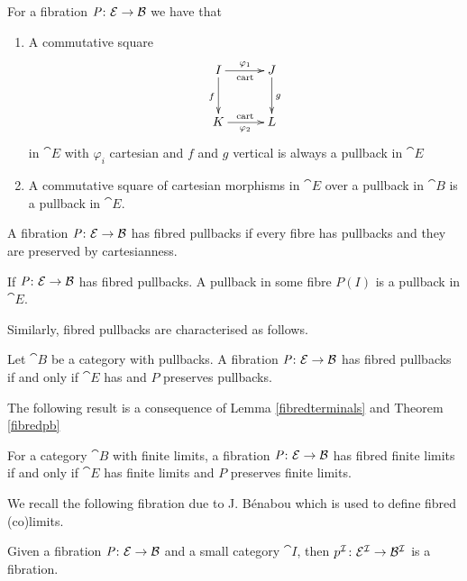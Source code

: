 \documentclass[9pt, leqno]{amsart}
\begin{document}
\begin{lemma}[\cite{TS}] For a fibration $\operatorname{\textit{P} \colon \mathcal{E} \rightarrow \mathcal{B}}$ we have that
	
	\begin{enumerate}
		\item A commutative square
		\begin{equation*}
			\xymatrix@=1cm{
				I \ar[d]_{f} \ar[r]^{\varphi_1}_{\text{cart}} & J \ar[d]^{g} \\
				K \ar[r]_{\varphi_2}^{\text{cart}} & L
			}
		\end{equation*}
		in $\cat{E}$ with $\varphi_i$ cartesian and $f$ and $g$ vertical is always a pullback in $\cat{E}$
		
		\item A commutative square of cartesian morphisms in $\cat{E}$ over a pullback in $\cat{B}$ is a pullback in $\cat{E}$.
	\end{enumerate}
	 
\end{lemma}

\begin{defn}
	A fibration $\operatorname{\textit{P} \colon \mathcal{E} \rightarrow \mathcal{B}}$ has fibred pullbacks if every fibre has pullbacks and they are preserved by cartesianness.
\end{defn}

\begin{lemma}
	If $\operatorname{\textit{P} \colon \mathcal{E} \rightarrow \mathcal{B}}$ has fibred pullbacks. A pullback in some fibre $P(I)$ is a pullback in $\cat{E}$.
\end{lemma}
Similarly, fibred pullbacks are characterised as follows.
\begin{thm}\label{fibredpb}
	Let $\cat{B}$ be a category with pullbacks. A fibration $\operatorname{\textit{P} \colon \mathcal{E} \rightarrow \mathcal{B}}$ has fibred pullbacks if and only if $\cat{E}$ has and $P$ preserves pullbacks. 
\end{thm}

The following result is a consequence of Lemma \ref{fibredterminals} and Theorem \ref{fibredpb} 

\begin{thm}
	For a category $\cat{B}$ with finite limits, a fibration $\operatorname{\textit{P} \colon \mathcal{E} \rightarrow \mathcal{B}}$ has fibred finite limits if and only if $\cat{E}$ has finite limits and $P$ preserves finite limits. 
\end{thm}

We recall the following fibration due to J. B\'{e}nabou which is used to define fibred (co)limits.

\begin{prop}
	Given a fibration $\operatorname{\textit{P} \colon \mathcal{E} \rightarrow \mathcal{B}}$ and a small category $\cat{I}$, then $p^{\mathcal{I}} \colon \mathcal{E}^{\mathcal{I}} \to \mathcal{B}^{\mathcal{I}}$	 is a fibration. 
\end{prop}
\end{document}
